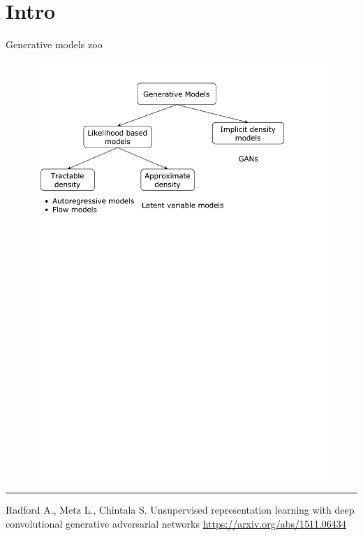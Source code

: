 \documentclass{beamer}
\begin{document}
\section{Intro}
\begin{frame}{Generative models zoo}
    \begin{figure}
        \centering
        \includegraphics[width=1.0\linewidth]{figs/generative_models_zoo.pdf}
        \label{fig:generative_models_zoo}
    \end{figure}
\vfill
\hrule\medskip
{\scriptsize Radford A., Metz L., Chintala S. Unsupervised representation learning with deep convolutional generative adversarial networks  \href{https://arxiv.org/abs/1511.06434}{https://arxiv.org/abs/1511.06434}}
\end{frame}
\end{document}
